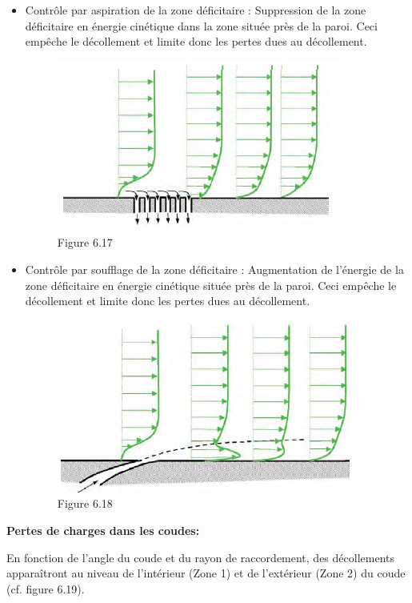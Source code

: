 \begin{itemize}
\item Contrôle par aspiration de la zone déficitaire : Suppression de la zone déficitaire en énergie cinétique dans la zone située près de la paroi. Ceci empêche le décollement et limite donc les pertes dues au décollement.
\begin{figure}[H]
\begin{center}
\includegraphics[scale=0.40]{ch6/78.png}
\caption*{Figure 6.17}
\end{center}
\end{figure}
\item Contrôle par soufflage de la zone déficitaire : Augmentation de l’énergie de la zone déficitaire en énergie cinétique située près de la paroi. Ceci empêche le décollement et limite donc les pertes dues au décollement.
\begin{figure}[H]
\begin{center}
\includegraphics[scale=0.40]{ch6/79.png}
\caption*{Figure 6.18}
\end{center}
\end{figure}
\end{itemize}

\textbf{Pertes de charges dans les coudes:}

En fonction de l’angle du coude et du rayon de raccordement, des décollements apparaîtront au niveau de l’intérieur (Zone 1) et de l’extérieur (Zone 2) du coude (cf. figure 6.19).

